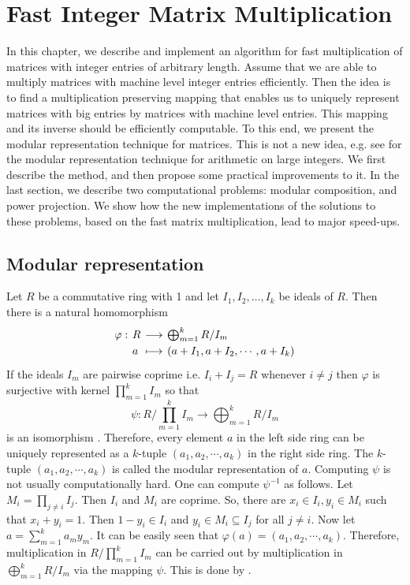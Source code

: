 \chapter{Fast Integer Matrix Multiplication}
\label{chapter:fastMM}

In this chapter, we describe and implement an algorithm for fast multiplication of matrices with 
integer entries of arbitrary length. Assume that we are able to multiply matrices with machine level 
integer entries efficiently. Then the idea is to find a multiplication preserving mapping that 
enables us to uniquely represent matrices with big entries by matrices with machine level entries. 
This mapping and its inverse should be efficiently computable. To this end, we present the modular 
representation technique for matrices. This is not a new idea, e.g. see \cite{Knuth1988} for the 
modular representation technique for arithmetic on large integers. We first describe the method, and 
then propose some practical improvements to it. In the last section, we describe two computational 
problems: modular composition, and power projection. We show how the new implementations of the 
solutions to these problems, based on the fast matrix multiplication, lead to major speed-ups.









\section{Modular representation}
\label{section:mrep}

Let $R$ be a commutative ring with 1 and let $I_1, I_2, \dots, I_k$ be ideals of $R$. Then there is 
a natural homomorphism
$$
\setlength\arraycolsep{2pt}
\renewcommand{\arraystretch}{1.25}
\begin{array}{llll}
\varphi : & R & \longrightarrow & \bigoplus_{m = 1}^k {R/I_m} \\
& a & \longmapsto & (a + I_1, a + I_2, \cdots, a + I_k)
\end{array}
$$
If the ideals $I_m$ are pairwise coprime i.e. $I_i + I_j = R$ whenever $i \ne j$ then $\varphi$ is 
surjective with kernel $\prod_{m = 1}^k {I_m}$ so that 
$$
\psi : R/\prod_{m = 1}^k {I_m} \longrightarrow \bigoplus_{m = 1}^k {R/I_m}
$$
is an isomorphism \cite{Atiyah1969}. Therefore, every element $a$ in the left side ring can be 
uniquely represented as a $k$-tuple $(a_1, a_2, \cdots, a_k)$ in the right side ring. The $k$-tuple 
$(a_1, a_2, \cdots, a_k)$ is called the modular representation of $a$. Computing $\psi$ is not 
usually computationally hard. One can compute $\psi^{-1}$ as follows. Let $M_i = \prod_{j \ne i} 
{I_j}$. Then $I_i$ and $M_i$ are coprime. So, there are $x_i \in I_i, y_i \in M_i$ such that $x_i + 
y_i = 1$. Then $1 - y_i \in I_i$ and $y_i \in M_i \subseteq I_j$ for all $j \ne i$. Now let $a = 
\sum_{m = 1}^k {a_my_m}$. It can be easily seen that $\varphi(a) = (a_1, a_2, \cdots, a_k)$. 
Therefore, multiplication in $R/\prod_{m = 1}^k {I_m}$ can be carried out by multiplication in 
$\bigoplus_{m = 1}^k {R/I_m}$ via the mapping $\psi$. This is done by 
.

